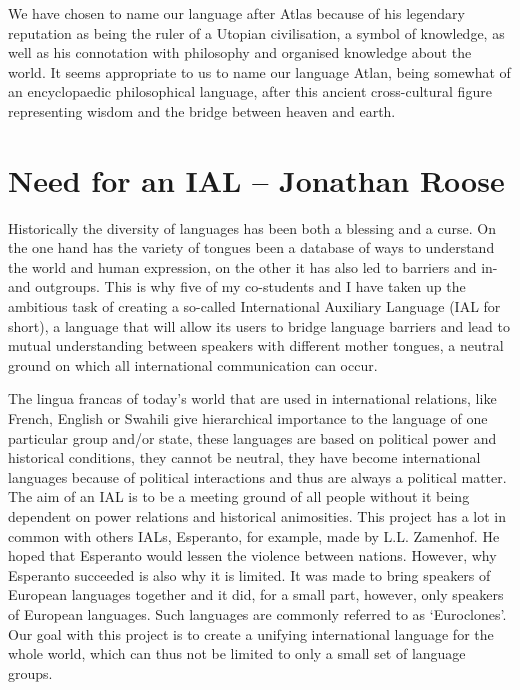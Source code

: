 We have chosen to name our language after Atlas because of his legendary reputation as being the ruler of a Utopian civilisation, a symbol of knowledge, as well as his connotation with philosophy and organised knowledge about the world. It seems appropriate to us to name our language Atlan, being somewhat of an encyclopaedic philosophical language, after this ancient cross-cultural figure representing wisdom and the bridge between heaven \nopagebreak and earth. 


\section{Need for an IAL -- {\small Jonathan Roose}}
Historically the diversity of languages has been both a blessing and a curse. On the one hand has the variety of tongues been a database of ways to understand the world and human expression, on the other it has also led to barriers and in- and outgroups. This is why five of my co-students and I have taken up the ambitious task of creating a so-called International Auxiliary Language (IAL for short), a language that will allow its users to bridge language barriers and lead to mutual understanding between speakers with different mother tongues, a neutral ground on which all international communication can occur. 

The lingua francas of today's world that are used in international relations, like French, English or Swahili give hierarchical importance to the language of one particular group and/or state, these languages are based on political power and historical conditions, they cannot be neutral, they have become international languages because of political interactions and thus are always a political matter. The aim of an IAL is to be a meeting ground of all people without it being dependent on power relations and historical animosities. This project has a lot in common with others IALs, Esperanto, for example, made by L.L. Zamenhof. He hoped that Esperanto would lessen the violence between nations. However, why Esperanto succeeded is also why it is limited. It was made to bring speakers of European languages together and it did, for a small part, however, only speakers of European languages. Such languages are commonly referred to as ‘Euroclones’. Our goal with this project is to create a unifying international language for the whole world, which can thus not be limited to only a small set of language groups. 

